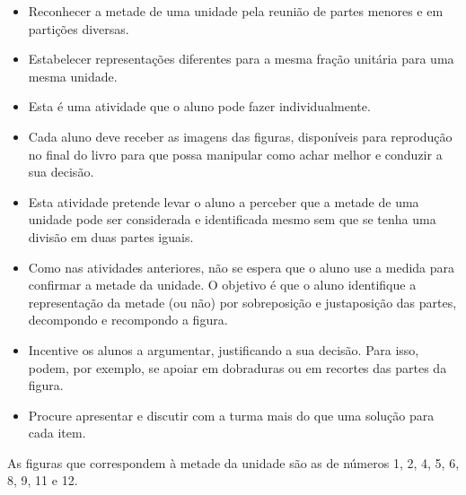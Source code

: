 \begin{atividade}\label{chap1-ativ10}
\objetivos
\begin{itemize} %
    \item       Reconhecer a metade de uma unidade pela reunião de partes menores e em partições diversas.
    \item       Estabelecer representações diferentes para a mesma fração unitária para uma mesma unidade.
\end{itemize} %

\discussoes
  \begin{itemize} %
  \item       Esta é uma atividade que o aluno pode fazer individualmente.
  \item       Cada aluno deve receber as imagens das figuras, disponíveis para reprodução no final do livro para que possa manipular como achar melhor e conduzir a sua decisão.
  \item       Esta atividade pretende levar o aluno a perceber que a metade de uma unidade pode ser considerada e identificada mesmo sem que se tenha uma divisão em duas partes iguais.
  \item       Como nas atividades anteriores, não se espera que o aluno use a medida para confirmar a metade da unidade. O objetivo é que o aluno identifique a representação da metade (ou não) por sobreposição e justaposição das partes, decompondo e recompondo a figura.
  \item       Incentive os alunos a argumentar, justificando a sua decisão. Para isso, podem, por exemplo, se apoiar em dobraduras ou em recortes das partes da figura.
  \item       Procure apresentar e discutir com a turma mais do que uma solução para cada item.
\end{itemize} %

\solucao
  As figuras que correspondem à metade da unidade são as de números 1, 2, 4, 5, 6, 8, 9, 11 e 12.

\end{atividade}


